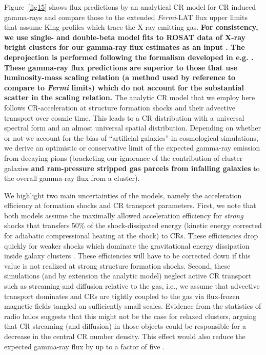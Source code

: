 \documentclass[10pt,aps,pra,reprint,amsmath,amsfonts,amssymb,showpacs,nofootinbib,floatfix]{revtex4-1}
\def\C#1{{\bf #1}}
\newcommand{\Fermi}{{\em Fermi}\xspace}
\begin{document}
Figure~\ref{fig15} shows flux predictions by an analytical CR model
\cite{2010MNRAS.409..449P} for CR induced gamma-rays and compare those
to the extended \Fermi-LAT flux upper limits that assume King profiles
which trace the X-ray emitting gas. \C{For consistency, we use single-
  and double-beta model fits to ROSAT data of X-ray bright clusters
  for our gamma-ray flux estimates as an input
  \cite{2007A&A...466..805C}. The deprojection is performed following
  the formalism developed in e.g. \cite{2004A&A...413...17P}. These
  gamma-ray flux predictions are superior to those that use
  luminosity-mass scaling relation (a method used by reference
  \cite{2010ApJ...717L..71A} to compare to \Fermi limits) which do not
  account for the substantial scatter in the scaling relation.} The
analytic CR model that we employ here follows CR-acceleration at
structure formation shocks and their advective transport over cosmic
time. This leads to a CR distribution with a universal spectral form
and an almost universal spatial distribution. Depending on whether or
not we account for the bias of ``artificial galaxies'' in cosmological
simulations, we derive an optimistic or conservative limit of the
expected gamma-ray emission from decaying pions (bracketing our
ignorance of the contribution of cluster galaxies \C{and ram-pressure
  stripped gas parcels from infalling galaxies} to the overall
gamma-ray flux from a cluster).

We highlight two main uncertainties of the models, namely the
acceleration efficiency at formation shocks and CR transport
parameters. First, we note that both models assume the maximally
allowed acceleration efficiency for {\em strong} shocks that transfers
50\% of the shock-dissipated energy (kinetic energy corrected for
adiabatic compressional heating at the shock) to CRs. These
efficiencies drop quickly for weaker shocks \cite{2007A&A...473...41E}
which dominate the gravitational energy dissipation inside galaxy
clusters \cite{2006MNRAS.367..113P}. These efficiencies will have to
be corrected down if this value is not realized at strong structure formation
shocks. Second, these simulations (and by extension the analytic
model) neglect active CR transport such as streaming and diffusion
relative to the gas, i.e., we assume that advective transport
dominates and CRs are tightly coupled to the gas via flux-frozen
magnetic fields tangled on sufficiently small scales. Evidence from
the statistics of radio halos suggests that this might not be the case
for relaxed clusters, arguing that CR streaming (and diffusion) in
those objects could be responsible for a decrease in the central CR
number density. This effect would also reduce the expected gamma-ray
flux by up to a factor of five \cite{2011A&A...527A..99E}.
\end{document}
